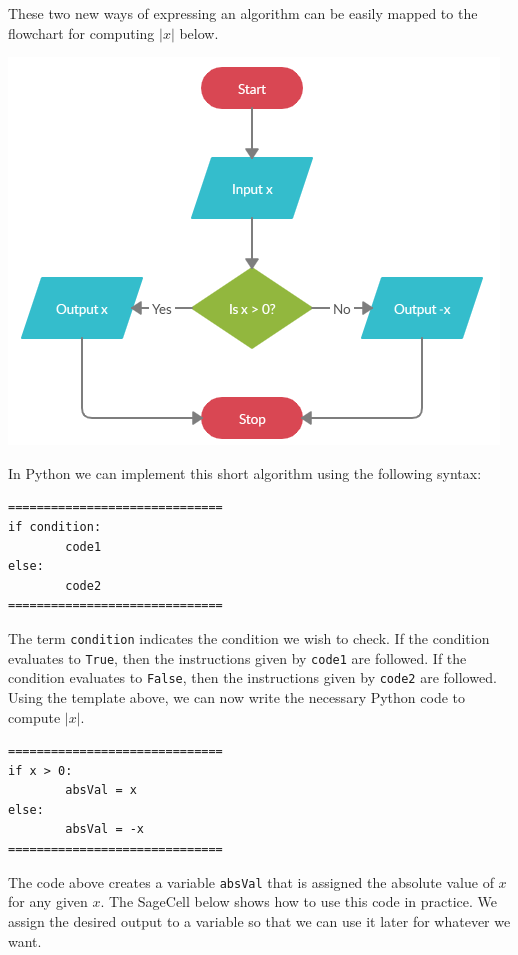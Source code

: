 \documentclass{ximera}
\begin{document}
These two new ways of expressing an algorithm can be easily mapped to the flowchart for computing $|x|$ below.

\begin{center}
	\includegraphics{absalgo.png}
\end{center}

In Python we can implement this short algorithm using the following syntax:

\begin{verbatim}
==============================
if condition:
        code1
else:
        code2
==============================
\end{verbatim}

The term \verb|condition| indicates the condition we wish to check. If the condition evaluates to \verb|True|, then the instructions given by \verb|code1| are followed. If the condition evaluates to \verb|False|, then the instructions given by \verb|code2| are followed. Using the template above, we can now write the necessary Python code to compute $|x|$.

\begin{verbatim}
==============================
if x > 0:
        absVal = x
else:
        absVal = -x
==============================
\end{verbatim}

The code above creates a variable \verb|absVal| that is assigned the absolute value of $x$ for any given $x$. The SageCell below shows how to use this code in practice. We assign the desired output to a variable so that we can use it later for whatever we want.
\end{document}
